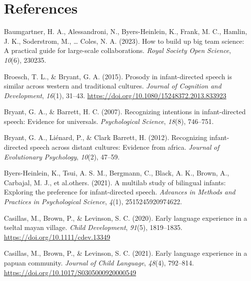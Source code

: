 \documentclass[
  ,man,floatsintext]{apa6}
\newlength{\cslhangindent}
\newlength{\cslentryspacingunit} %
\newenvironment{CSLReferences}[2] %
 {%
  \setlength{\parindent}{0pt}
  \ifodd #1
  \let\oldpar\par
  \def\par{\hangindent=\cslhangindent\oldpar}
  \fi
  \setlength{\parskip}{#2\cslentryspacingunit}
 }%
 {}
\begin{document}
\newpage

\hypertarget{references}{%
\section{References}\label{references}}

\begingroup
\setlength{\parindent}{-0.5in}
\setlength{\leftskip}{0.5in}

\hypertarget{refs}{}
\begin{CSLReferences}{1}{0}
\leavevmode{}%
Baumgartner, H. A., Alessandroni, N., Byers-Heinlein, K., Frank, M. C., Hamlin, J. K., Soderstrom, M., \ldots{} Coles, N. A. (2023). How to build up big team science: A practical guide for large-scale collaborations. \emph{Royal Society Open Science}, \emph{10}(6), 230235.

\leavevmode{}%
Broesch, T. L., \& Bryant, G. A. (2015). Prosody in infant-directed speech is similar across western and traditional cultures. \emph{Journal of Cognition and Development}, \emph{16}(1), 31--43. \url{https://doi.org/10.1080/15248372.2013.833923}

\leavevmode{}%
Bryant, G. A., \& Barrett, H. C. (2007). Recognizing intentions in infant-directed speech: Evidence for universals. \emph{Psychological Science}, \emph{18}(8), 746--751.

\leavevmode{}%
Bryant, G. A., Liénard, P., \& Clark Barrett, H. (2012). Recognizing infant-directed speech across distant cultures: Evidence from africa. \emph{Journal of Evolutionary Psychology}, \emph{10}(2), 47--59.

\leavevmode{}%
Byers-Heinlein, K., Tsui, A. S. M., Bergmann, C., Black, A. K., Brown, A., Carbajal, M. J., et al.others. (2021). A multilab study of bilingual infants: Exploring the preference for infant-directed speech. \emph{Advances in Methods and Practices in Psychological Science}, \emph{4}(1), 2515245920974622.

\leavevmode{}%
Casillas, M., Brown, P., \& Levinson, S. C. (2020). Early language experience in a tseltal mayan village. \emph{Child Development}, \emph{91}(5), 1819--1835. \url{https://doi.org/10.1111/cdev.13349}

\leavevmode{}%
Casillas, M., Brown, P., \& Levinson, S. C. (2021). Early language experience in a papuan community. \emph{Journal of Child Language}, \emph{48}(4), 792--814. \url{https://doi.org/10.1017/S0305000920000549}


\end{CSLReferences}
\end{document}
